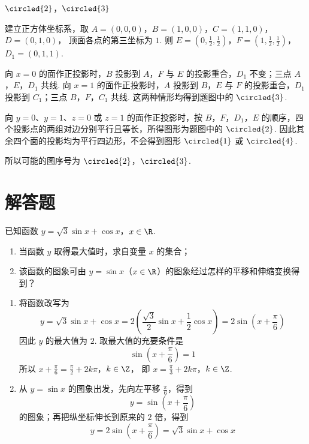 \begin{answer}
\(\circled{2}\)，\(\circled{3}\)
\end{answer}

\begin{solution}
建立正方体坐标系，取
\(A=(0,0,0)\)，\(B=(1,0,0)\)，\(C=(1,1,0)\)，\(D=(0,1,0)\)，
顶面各点的第三坐标为 \(1\). 则
\(E=\left(0,\frac12,\frac12\right)\)，\(F=\left(1,\frac12,\frac12\right)\)，\(D_1=(0,1,1)\).

向 \(x=0\) 的面作正投影时，\(B\) 投影到 \(A\)，\(F\) 与 \(E\) 的投影重合，\(D_1\) 不变；三点 \(A\)，\(E\)，\(D_1\) 共线. 向 \(x=1\) 的面作正投影时，\(A\) 投影到 \(B\)，\(E\) 与 \(F\) 的投影重合，\(D_1\) 投影到 \(C_1\)；三点 \(B\)，\(F\)，\(C_1\) 共线. 这两种情形均得到题图中的 \(\circled{3}\).

向 \(y=0\)、\(y=1\)、\(z=0\) 或 \(z=1\) 的面作正投影时，按 \(B\)，\(F\)，\(D_1\)，\(E\) 的顺序，四个投影点的两组对边分别平行且等长，所得图形为题图中的 \(\circled{2}\). 因此其余四个面的投影均为平行四边形，不会得到图形 \(\circled{1}\) 或 \(\circled{4}\).

所以可能的图序号为 \(\circled{2}\)，\(\circled{3}\).
\end{solution}

\section{解答题}
\begin{problem}
已知函数 \(y = \sqrt{3}\sin x + \cos x\)，\(x \in \R\).

\begin{enumerate}
\item 当函数 \(y\) 取得最大值时，求自变量 \(x\) 的集合；
\item 该函数的图象可由 \(y = \sin x\)（\(x \in \R\)）的图象经过怎样的平移和伸缩变换得到？
\end{enumerate}
\end{problem}

\begin{solution}
\begin{enumerate}
\item 将函数改写为
\[
y=\sqrt{3}\sin x+\cos x
=2\left(\frac{\sqrt{3}}2\sin x+\frac12\cos x\right)
=2\sin\left(x+\frac{\pi}{6}\right)
\]
因此 \(y\) 的最大值为 \(2\). 取最大值的充要条件是
\[
\sin\left(x+\frac{\pi}{6}\right)=1
\]
所以
\(x+\frac{\pi}{6}=\frac{\pi}{2}+2k\pi\)，\(k\in\Z\)，
即
\(x=\frac{\pi}{3}+2k\pi\)，\(k\in\Z\).
\item 从 \(y=\sin x\) 的图象出发，先向左平移 \(\frac{\pi}{6}\)，得到
\[
y=\sin\left(x+\frac{\pi}{6}\right)
\]
的图象；再把纵坐标伸长到原来的 \(2\) 倍，得到
\[
y=2\sin\left(x+\frac{\pi}{6}\right)
=\sqrt{3}\sin x+\cos x
\]
\end{enumerate}
\end{solution}

